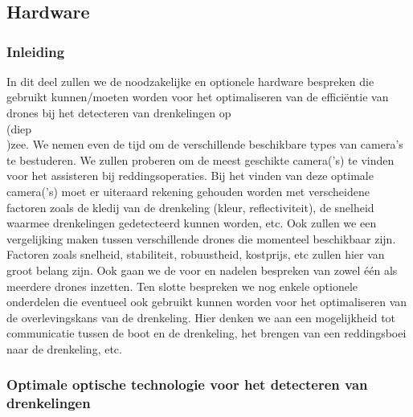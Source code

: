 \chapter{}
\label{ch:stand-van-zaken}



\section{Hardware}

\subsection{Inleiding}

In dit deel zullen we de noodzakelijke en optionele hardware bespreken die gebruikt kunnen/moeten worden voor het optimaliseren van de efficiëntie van drones bij het detecteren van drenkelingen op \\(diep\\)zee. We nemen even de tijd om de verschillende beschikbare types van camera's te bestuderen. We zullen proberen om de meest geschikte camera('s) te vinden voor het assisteren bij reddingsoperaties. Bij het vinden van deze optimale camera('s) moet er uiteraard rekening gehouden worden met verscheidene factoren zoals de kledij van de drenkeling (kleur, reflectiviteit), de snelheid waarmee drenkelingen gedetecteerd kunnen worden, etc. Ook zullen we een vergelijking maken tussen verschillende drones die momenteel beschikbaar zijn. Factoren zoals snelheid, stabiliteit, robuustheid, kostprijs, etc zullen hier van groot belang zijn. Ook gaan we de voor en nadelen bespreken van zowel één als meerdere drones inzetten. Ten slotte bespreken we nog enkele optionele onderdelen die eventueel ook gebruikt kunnen worden voor het optimaliseren van de overlevingskans van de drenkeling. Hier denken we aan een mogelijkheid tot communicatie tussen de boot en de drenkeling, het brengen van een reddingsboei naar de drenkeling, etc.

\subsection{Optimale optische technologie voor het detecteren van drenkelingen}

